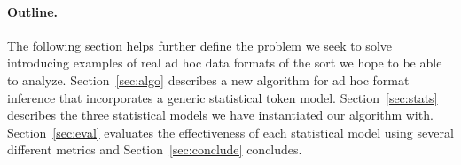 \paragraph*{Outline.}
The following section helps further define the problem we seek
to solve introducing examples of real ad hoc data formats of the
sort we hope to be able to analyze.  Section~\ref{sec:algo}
describes a new algorithm for ad hoc format inference that
incorporates a generic statistical token model.  Section~\ref{sec:stats}
describes the three statistical models we have instantiated our
algorithm with.  Section~\ref{sec:eval} evaluates the effectiveness
of each statistical model using several different metrics and
Section~\ref{sec:conclude} concludes.
